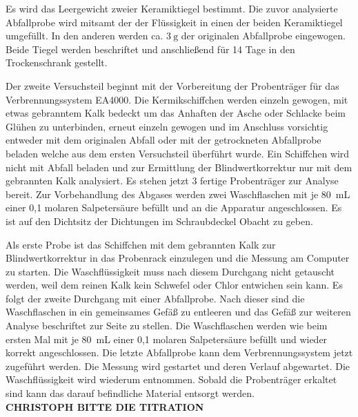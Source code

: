 Es wird das Leergewicht zweier Keramiktiegel bestimmt.
Die zuvor analysierte Abfallprobe wird mitsamt der der Flüssigkeit in einen der beiden Keramiktiegel umgefüllt.  
In den anderen werden ca. $\SI{3}{\gram}$ der originalen Abfallprobe eingewogen. Beide Tiegel werden beschriftet und anschließend für 14 Tage in den Trockenschrank gestellt.

Der zweite Versuchsteil beginnt mit der Vorbereitung der Probenträger für das Verbrennungssystem EA4000. Die Kermikschiffchen werden einzeln gewogen, mit etwas gebranntem Kalk bedeckt um das Anhaften der Asche oder Schlacke beim Glühen zu unterbinden, erneut einzeln gewogen und im Anschluss vorsichtig entweder mit dem originalen Abfall oder mit der getrockneten Abfallprobe beladen welche aus dem ersten Versuchsteil überführt wurde. Ein Schiffchen wird nicht mit Abfall beladen und zur Ermittlung der Blindwertkorrektur nur mit dem gebrannten Kalk analysiert. Es stehen jetzt 3 fertige Probenträger zur Analyse bereit.
Zur Vorbehandlung des Abgases werden zwei Waschflaschen mit je \SI{80}{\milli\liter} einer 0,1 molaren Salpetersäure befüllt und an die Apparatur angeschlossen. Es ist auf den Dichtsitz der Dichtungen im Schraubdeckel Obacht zu geben.

Als erste Probe ist das Schiffchen mit dem gebrannten Kalk zur Blindwertkorrektur in das Probenrack einzulegen und die Messung am Computer zu starten.
Die Waschflüssigkeit muss nach diesem Durchgang nicht getauscht werden, weil dem reinen Kalk kein Schwefel oder Chlor entwichen sein kann. 
Es folgt der zweite Durchgang mit einer Abfallprobe. Nach dieser sind die Waschflaschen in ein gemeinsames Gefäß zu entleeren und das Gefäß zur weiteren Analyse beschriftet zur Seite zu stellen. Die Waschflaschen werden wie beim ersten Mal mit je \SI{80}{\milli\liter} einer 0,1 molaren Salpetersäure befüllt und wieder korrekt angeschlossen.
Die letzte Abfallprobe kann dem Verbrennungssystem jetzt zugeführt werden. Die Messung wird gestartet und deren Verlauf abgewartet. Die Waschflüssigkeit wird wiederum entnommen.
Sobald die Probenträger erkaltet sind kann das darauf befindliche Material entsorgt werden.\\

\vspace{5cm}
\textbf{CHRISTOPH BITTE DIE TITRATION}